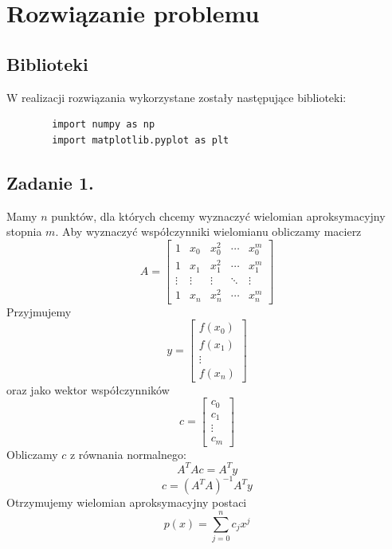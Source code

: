 \documentclass[11pt]{scrartcl}
\begin{document}
    \section{Rozwiązanie problemu}
    \subsection{Biblioteki}
    W realizacji rozwiązania wykorzystane zostały następujące
    biblioteki:
    \begin{lstlisting}
        import numpy as np
        import matplotlib.pyplot as plt
    \end{lstlisting}

    \subsection{Zadanie 1.}
    Mamy $n$ punktów, dla których chcemy wyznaczyć wielomian
    aproksymacyjny stopnia $m$. Aby wyznaczyć współczynniki wielomianu
    obliczamy macierz
    \[
        A=
        \begin{bmatrix}
            1 & x_0 & x_0^2 & \cdots & x_0^m \\
            1 & x_1 & x_1^2 & \cdots & x_1^m \\
            \vdots & \vdots & \vdots & \ddots & \vdots \\
            1 & x_n & x_n^2 & \cdots & x_n^m
        \end{bmatrix}
    \]
    Przyjmujemy
    \[
        y=
        \begin{bmatrix}
            f(x_0) \\
            f(x_1) \\
            \vdots \\
            f(x_n)
        \end{bmatrix}
    \]
    oraz jako wektor współczynników
    \[
        c=
        \begin{bmatrix}
            c_0 \\
            c_1 \\
            \vdots \\
            c_m
        \end{bmatrix}
    \]
    Obliczamy $c$ z równania normalnego:
    \[
        A^TAc=A^Ty
    \]
    \[
        c=(A^TA)^{-1}A^Ty
    \]
    Otrzymujemy wielomian aproksymacyjny postaci
    \[
        p(x)=\sum_{j=0}^{n}c_jx^j
    \]
\end{document}

